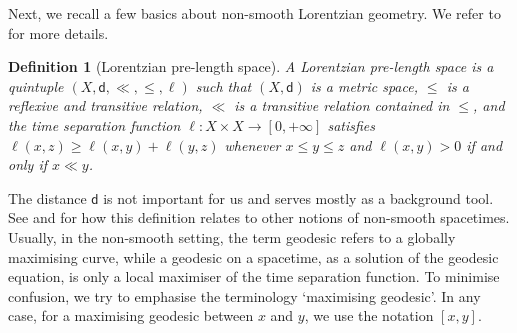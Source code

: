 \documentclass[hidelinks,12pt,a4paper]{article}
\numberwithin{equation}{section}
\theoremstyle{plain}
\newtheorem{definition}{Definition}[section]
\theoremstyle{definition}
\newcommand{\LpLSn}{Lo\-rentz\-ian pre-length space}
\DeclareMathOperator{\TSec}{TSec}
\begin{document}



Next, we recall a few basics about non-smooth Lorentzian geometry. We refer to \cite{KS18, BS23, BKR24} for more details. 

\begin{definition}[\LpLSn]
A Lorentzian pre-length space is a quintuple $(X,\mathsf d,\ll, \leq ,\ell)$ such that $(X,\mathsf d)$ is a metric space, $\leq$ is a reflexive and transitive relation, $\ll$ is a transitive relation contained in $\leq$, and the time separation function $\ell: X \times X \to [0,+\infty]$ satisfies $\ell(x,z) \geq \ell(x,y) + \ell(y,z)$ whenever $x \leq y \leq z$ and $\ell(x,y) > 0$ if and only if $x \ll y$.
\end{definition} 

The distance $\mathsf d$ is not important for us and serves mostly as a background tool. 
See \cite[Remark 2.8]{Octet} and \cite[Section 4.1]{BHNR25}  for how this definition relates to other notions of non-smooth spacetimes. 
Usually, in the non-smooth setting, the term geodesic refers to a globally maximising curve, while a geodesic on a spacetime, as a solution of the geodesic equation, is only a local maximiser of the time separation function. 
To minimise confusion, we try to emphasise the terminology `maximising geodesic'. 
In any case, for a maximising geodesic between $x$ and $y$, we use the notation $[x,y]$. 
\end{document}
